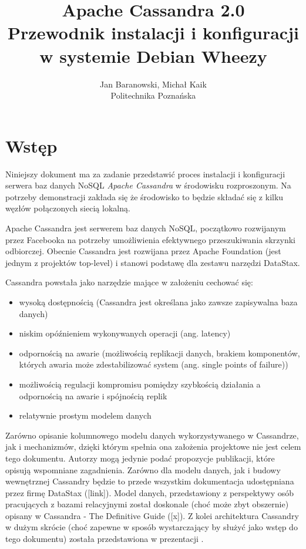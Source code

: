 \documentclass{article}
\begin{document}
\title{Apache Cassandra 2.0\\\vspace{2ex}Przewodnik instalacji i konfiguracji w systemie Debian Wheezy}
\author{Jan Baranowski, Michał Kaik\\Politechnika Poznańska}
\maketitle

\section{Wstęp}

Niniejszy dokument ma za zadanie przedstawić proces instalacji i konfiguracji serwera baz danych NoSQL \emph{Apache Cassandra} w środowisku rozproszonym.
Na potrzeby demonstracji zakłada się że środowisko to będzie składać się z kilku węzłów połączonych siecią lokalną.

Apache Cassandra jest serwerem baz danych NoSQL, początkowo rozwijanym przez Facebooka na potrzeby umożliwienia efektywnego przeszukiwania skrzynki odbiorczej. Obecnie Cassandra jest rozwijana przez Apache Foundation (jest jednym z projektów top-level) i stanowi podstawę dla zestawu narzędzi DataStax. 

Cassandra powstała jako narzędzie mające w założeniu cechować się:
\begin{itemize}
\item wysoką dostępnością (Cassandra jest określana jako zawsze zapisywalna baza danych)
\item niskim opóźnieniem wykonywanych operacji (ang. latency)
\item odpornością na awarie (możliwością replikacji danych, brakiem komponentów, których awaria może zdestabilizować system (ang. single points of failure))
\item możliwością regulacji kompromisu pomiędzy szybkością działania a odpornością na awarie i spójnością replik
\item relatywnie prostym modelem danych
\end{itemize}

Zarówno opisanie kolumnowego modelu danych wykorzystywanego w Cassandrze, jak i mechanizmów, dzięki którym spełnia ona założenia projektowe nie jest celem tego dokumentu. Autorzy mogą jedynie podać propozycje publikacji, które opisują wspomniane zagadnienia. Zarówno dla modelu danych, jak i budowy wewnętrznej Cassandry będzie to przede wszystkim dokumentacja udostępniana przez firmę DataStax ([link]). Model danych, przedstawiony z perspektywy osób pracujących z bazami relacyjnymi został doskonale (choć może zbyt obszernie) opisany w Cassandra - The Definitive Guide ([x]). Z kolei architektura Cassandry w dużym skrócie (choć zapewne w sposób wystarczający by służyć jako wstęp do tego dokumentu) została przedstawiona w prezentacji \cite{JanBaranowski2014}.
\end{document}
